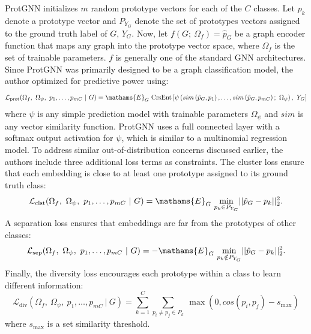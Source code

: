 \documentclass[
  11pt,
  letterpaper,
]{article}
\begin{document}
\quad ProtGNN initializes \(m\) random prototype vectors for each of the
\(C\) classes. Let \(p_k\) denote a prototype vector and \(P_{Y_G}\)
denote the set of prototypes vectors assigned to the ground truth label
of \(G\), \(Y_G\). Now, let \(f(G; \ \Omega_f) = \hat p_G\) be a graph
encoder function that maps any graph into the prototype vector space,
where \(\Omega_f\) is the set of trainable parameters. \(f\) is
generally one of the standard GNN architectures. Since ProtGNN was
primarily designed to be a graph classification model, the author
optimized for predictive power using:\\
\begin{equation}
        \mathcal{L}_{\text{prot}}(\Omega_f, \ \Omega_\psi, \ p_1, \dots, p_{mC} \ | \ G)= \mathams{E}_G \ \text{CrsEnt} \left[\psi \left(sim\left(\hat p_G, p_1\right), \dots, sim\left(\hat p_G, p_{mC}\right); \ \Omega_\psi\right), \ Y_G \right]
    \end{equation} where \(\psi\) is any simple prediction model with
trainable parameters \(\Omega_\psi\) and \(sim\) is any vector
similarity function. ProtGNN uses a full connected layer with a softmax
output activation for \(\psi\), which is similar to a multinomial
regression model. To address similar out-of-distribution concerns
discussed earlier, the authors include three additional loss terms as
constraints. The cluster loss ensure that each embedding is close to at
least one prototype assigned to its ground truth class:\\
\begin{equation}
        \mathcal{L}_{\text{clst}}(\Omega_f, \ \Omega_\psi, \ p_1, \dots, p_{mC} \ | \ G) = \mathams{E}_G \ \underset{p_k \in P_{Y_G}}{\text{min}} || \hat p_G - p_k ||^2_2. 
    \end{equation} A separation loss ensures that embeddings are far
from the prototypes of other classes: \begin{equation}
        \mathcal{L}_{\text{sep}}(\Omega_f, \ \Omega_\psi, \ p_1, \dots, p_{mC} \ | \ G) = - \mathams{E}_G \ \underset{p_k \notin P_{Y_G}}{\text{min}} || \hat p_G - p_k ||^2_2. 
    \end{equation} Finally, the diversity loss encourages each prototype
within a class to learn different information:\\
\begin{equation}
            \mathcal{L}_{\text{div}}(\Omega_f, \ \Omega_\psi, \ p_1, \dots, p_{mC} \ | \ G) = \sum_{k=1}^C \sum_{p_i \neq p_j \in P_k} \ \max(0, cos(p_i, p_j) - s_\text{max})
    \end{equation} where \(s_\text{max}\) is a set similarity threshold.
\end{document}
